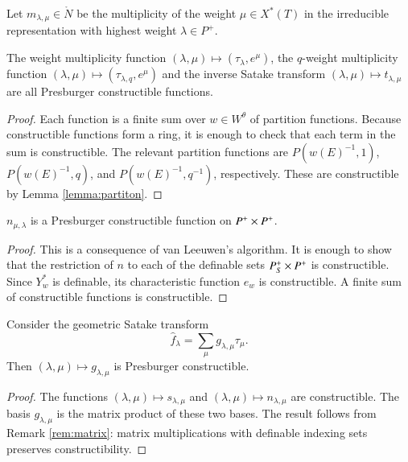 Let $m_{\lambda,\mu}\in \ring{N}$ be the multiplicity of the weight
$\mu\in X^*(T)$ in the irreducible representation with highest weight
$\lambda\in P^+$.

\begin{lemma}  
  The weight multiplicity function $(\lambda,\mu)\mapsto
  (\tau_\lambda,e^\mu)$, the $q$-weight multiplicity function
  $(\lambda,\mu)\mapsto (\tau_{\lambda,q},e^\mu)$ and the inverse
  Satake transform $(\lambda,\mu)\mapsto t_{\lambda,\mu}$ are all
  Presburger constructible functions.
\end{lemma}

\begin{proof} 
  Each function is a finite sum over $w\in W^\theta$ of partition
  functions.  Because constructible functions form a ring, it is
  enough to check that each term in the sum is constructible.  The
  relevant partition functions are $P(w(E)^{-1},1)$, $P(w(E)^{-1},q)$,
  and $P(w(E)^{-1},q^{-1})$, respectively.  These are constructible by
  Lemma \ref{lemma:partiton}.
\end{proof}

\begin{theorem}\label{lemma:van-leeuwen} 
  $n_{\mu,\lambda}$ is a Presburger constructible function on
  $P^+\times P^+$.
\end{theorem}

\begin{proof} 
  This is a consequence of van Leeuwen's algorithm.  It is enough to
  show that the restriction of $n$ to each of the definable sets
  $P^+_S\times P^+$ is constructible.  Since $Y^*_w$ is definable,
  its characteristic function $e_w$ is constructible.  A finite sum of
  constructible functions is constructible.
\end{proof}

\begin{corollary} 
  Consider the geometric Satake transform
\[
\hat f_\lambda = \sum_\mu g_{\lambda,\mu} \tau_\mu.
\]
Then $(\lambda,\mu)\mapsto g_{\lambda,\mu}$ is Presburger
constructible.
\end{corollary}

\begin{proof}  
  The functions $(\lambda,\mu)\mapsto s_{\lambda,\mu}$ and
  $(\lambda,\mu)\mapsto n_{\lambda,\mu}$ are constructible.  The basis
  $g_{\lambda,\mu}$ is the matrix product of these two bases.  The
  result follows from Remark \ref{rem:matrix}: matrix multiplications
  with definable indexing sets preserves constructibility.
\end{proof}

